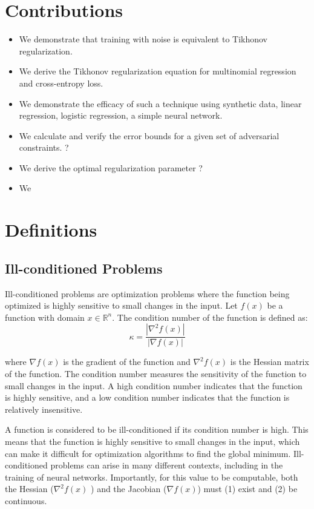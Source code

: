 \documentclass[conference]{IEEEtran}
\begin{document}
\section{Contributions}
\begin{itemize}
    \item We demonstrate that training with noise is equivalent to Tikhonov regularization. 
    \item We derive the Tikhonov regularization equation for multinomial regression and cross-entropy loss. 
    \item We demonstrate the efficacy of such a technique using synthetic data, linear regression, logistic regression, a simple neural network.
    \item We calculate and verify the error bounds for a given set of adversarial constraints. ?
    \item We derive the optimal regularization parameter ?
    \item We 
\end{itemize}

\section{Definitions}

\subsection{Ill-conditioned Problems}
Ill-conditioned problems are optimization problems where the function being optimized is highly sensitive to small changes in the input. Let $f(x)$ be a function with domain $x \in \mathbb{R}^n$. The condition number of the function is defined as:
\begin{equation}
\kappa = \frac{|\nabla^2 f(x)|}{|\nabla f(x)|}
\label{eq:condition_num}
\end{equation}

where $\nabla f(x)$ is the gradient of the function and $\nabla^2 f(x)$ is the Hessian matrix of the function. The condition number measures the sensitivity of the function to small changes in the input. A high condition number indicates that the function is highly sensitive, and a low condition number indicates that the function is relatively insensitive.

A function is considered to be ill-conditioned if its condition number is high. This means that the function is highly sensitive to small changes in the input, which can make it difficult for optimization algorithms to find the global minimum. Ill-conditioned problems can arise in many different contexts, including in the training of neural networks. Importantly, for this value to be computable, both the Hessian ($\nabla ^2 f(x)$ ) and the Jacobian ($\nabla f(x)$) must (1) exist and (2) be continuous.
\end{document}
